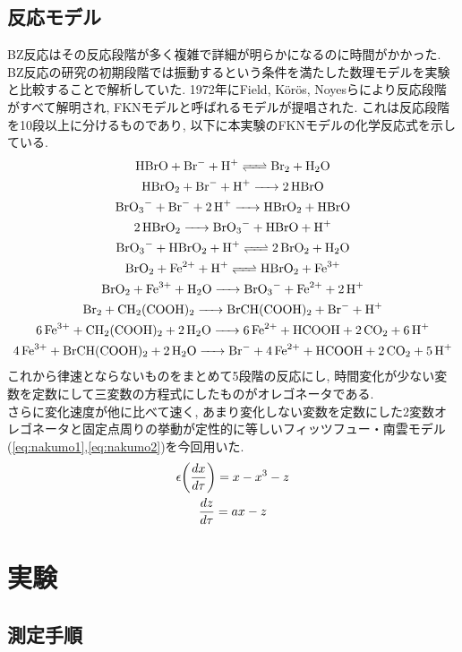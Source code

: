 \documentclass[11pt]{ltjsarticle}
\begin{document}
    \subsection*{反応モデル}
    BZ反応はその反応段階が多く複雑で詳細が明らかになるのに時間がかかった. BZ反応の研究の初期段階では振動するという条件を満たした数理モデルを実験と比較することで解析していた. 1972年にField, Körös, Noyesらにより反応段階がすべて解明され, FKNモデルと呼ばれるモデルが提唱された. 
    これは反応段階を10段以上に分けるものであり, 以下に本実験のFKNモデルの化学反応式を示している.
    \begin{gather}
      \ce{HBrO + Br^- + H+ <=> Br2 + H2O} \\
      \ce{HBrO2 + Br^- + H+ -> 2HBrO} \\
      \ce{BrO3^- + Br^- + 2H+ -> HBrO2 + HBrO} \\
      \ce{2HBrO2 -> BrO3^- + HBrO + H+} \\
      \ce{BrO3^- + HBrO2 + H+ <=> 2BrO2 + H2O} \\
      \ce{BrO2 + Fe^2+ + H+ <=> HBrO2 + Fe^3+} \\
      \ce{BrO2 + Fe^3+ + H2O -> BrO3^- + Fe^2+ + 2H+} \\
      \ce{Br2 + CH2(COOH)2 -> BrCH(COOH)2 + Br^- + H+} \\
      \ce{6Fe^3+ + CH2(COOH)2 + 2H2O -> 6Fe^2+ + HCOOH + 2CO2 + 6H+} \\
      \ce{4Fe^3+ + BrCH(COOH)2 + 2H2O -> Br^- + 4Fe^2+ + HCOOH + 2CO2 + 5H+}
    \end{gather}
    これから律速とならないものをまとめて5段階の反応にし, 時間変化が少ない変数を定数にして三変数の方程式にしたものがオレゴネータである.\\
    さらに変化速度が他に比べて速く, あまり変化しない変数を定数にした2変数オレゴネータと固定点周りの挙動が定性的に等しいフィッツフュー・南雲モデル(\cref{eq:nakumo1},\cref{eq:nakumo2})を今回用いた. 
    \begin{gather}
      \epsilon \qty(\frac{dx}{d\tau})=x-x^3-z
      \label{eq:nakumo1}\\
      \frac{dz}{d\tau}=ax-z
      \label{eq:nakumo2}
    \end{gather}
  \section*{実験}
    \subsection*{測定手順}
\end{document}

